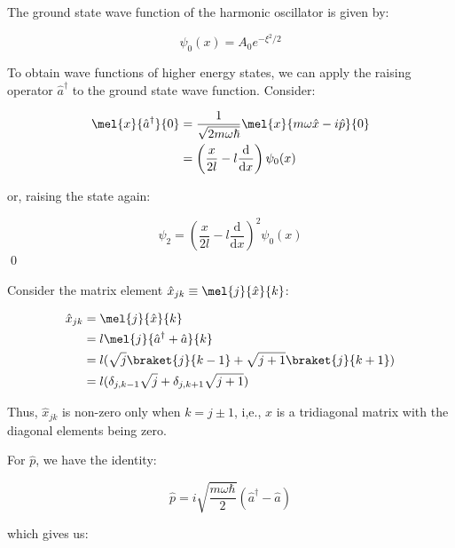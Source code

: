 \documentclass[12pt]{article}
\begin{document}
The ground state wave function of the harmonic oscillator is given by:

\begin{equation}
    \psi_{0}(x) = A_{0} e^{-\xi^{2}/2}
\end{equation}

To obtain wave functions of higher energy states, we can apply the raising operator $\hat{a}^{\dagger}$ to the ground state wave function. Consider:

\begin{equation}
\begin{split}
    \mel{x}{\hat{a}^{\dagger}}{0} &= \frac{1}{\sqrt{2m\omega \hbar}} \mel{x}{m\omega \hat{x} - i \hat{p}}{0} \\
    &= \left( \frac{x}{2l} - l \frac{\mathrm{d}}{\mathrm{d}x} \right) \psi_{0}(x) 
\end{split}
\end{equation}

or, raising the state again:

\begin{equation}
    \psi_{2} = \left( \frac{x}{2l} - l \frac{\mathrm{d}}{\mathrm{d}x} \right)^{2} \psi_{0}(x)
\end{equation}
\qed


Consider the matrix element $\hat{x}_{jk} \equiv \mel{j}{\hat{x}}{k}$:

\begin{equation}
\begin{split}
    \hat{x}_{jk} &= \mel{j}{\hat{x}}{k} \\
    &= l \mel{j}{\hat{a}^{\dagger} + \hat{a}}{k} \\
    &= l (\sqrt{j}\braket{j}{k - 1} + \sqrt{j + 1} \braket{j}{k + 1}) \\
    &= l (\delta_{j, k - 1} \sqrt{j} + \delta_{j, k + 1} \sqrt{j + 1})
\end{split}
\end{equation}

Thus, $\hat{x}_{jk}$ is non-zero only when $k = j \pm 1$, i,e., $\hat{x}$ is a tridiagonal matrix with the diagonal elements being zero.

For $\hat{p}$, we have the identity:

\begin{equation}
    \hat{p} = i \sqrt{\frac{m\omega \hbar}{2}} (\hat{a}^{\dagger} - \hat{a})
\end{equation}

which gives us:
\end{document}
